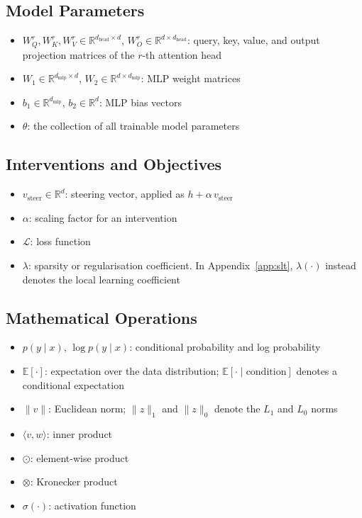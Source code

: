 \subsection{Model Parameters}
\begin{itemize}
    \item $W_Q^r, W_K^r, W_V^r \in \mathbb{R}^{d_{\text{head}} \times d}$, $W_O^r \in \mathbb{R}^{d \times d_{\text{head}}}$: query, key, value, and output projection matrices of the $r$-th attention head
    \item $W_1 \in \mathbb{R}^{d_{\text{mlp}} \times d}$, $W_2 \in \mathbb{R}^{d \times d_{\text{mlp}}}$: MLP weight matrices
    \item $b_1 \in \mathbb{R}^{d_{\mathrm{mlp}}}$,
          $b_2 \in \mathbb{R}^{d}$:
          MLP bias vectors
    \item $\theta$: the collection of all trainable model parameters
\end{itemize}

\subsection{Interventions and Objectives}
\begin{itemize}
    \item $v_{\text{steer}} \in \mathbb{R}^{d}$: steering vector, applied as
          $h + \alpha\, v_{\text{steer}}$
    \item $\alpha$: scaling factor for an intervention
    \item $\mathcal{L}$: loss function
    \item $\lambda$: sparsity or regularisation coefficient. In
          Appendix~\ref{app:slt}, $\lambda(\cdot)$ instead denotes the local
          learning coefficient
\end{itemize}

\subsection{Mathematical Operations}
\begin{itemize}
    \item $p(y \mid x)$, $\log p(y \mid x)$: conditional probability and log probability
    \item $\mathbb{E}[\cdot]$: expectation over the data distribution;
          $\mathbb{E}[\cdot \mid \text{condition}]$ denotes a conditional expectation
    \item $\|v\|$: Euclidean norm; $\|z\|_1$ and $\|z\|_0$ denote the
          $L_1$ and $L_0$ norms
    \item $\langle v, w \rangle$: inner product
    \item $\odot$: element-wise product
    \item $\otimes$: Kronecker product
    \item $\sigma(\cdot)$: activation function
\end{itemize}

